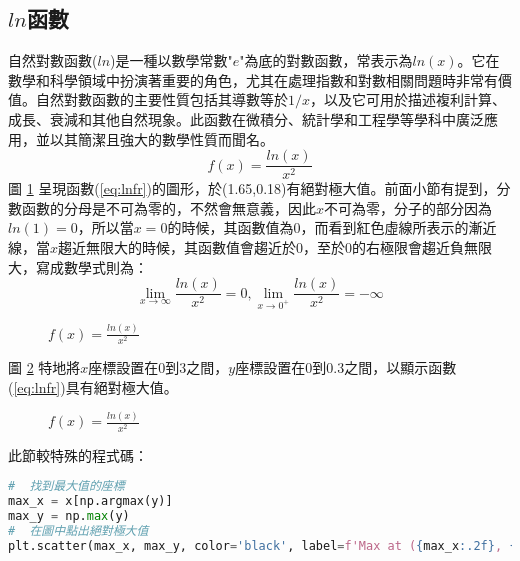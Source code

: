 \documentclass[12pt, a4paper]{article}
\begin{document}
\subsection{$ln$函數}
自然對數函數($ln$)是一種以數學常數"$e$"為底的對數函數，常表示為$ln(x)$。它在數學和科學領域中扮演著重要的角色，尤其在處理指數和對數相關問題時非常有價值。自然對數函數的主要性質包括其導數等於$1/x$，以及它可用於描述複利計算、成長、衰減和其他自然現象。此函數在微積分、統計學和工程學等學科中廣泛應用，並以其簡潔且強大的數學性質而聞名。
\begin{equation}\label{eq:lnfr}
f(x)= \frac{ln (x)}{x^2}
\end{equation}
圖 \ref{fig:lnfr_1} 呈現函數(\ref{eq:lnfr})的圖形，於(1.65,0.18)有絕對極大值。前面小節有提到，分數函數的分母是不可為零的，不然會無意義，因此$x$不可為零，分子的部分因為$ln(1)=0$，所以當$x=0$的時候，其函數值為0，而看到紅色虛線所表示的漸近線，當$x$趨近無限大的時候，其函數值會趨近於0，至於0的右極限會趨近負無限大，寫成數學式則為：
$$\lim_{x \rightarrow \infty}\frac{ln(x)}{x^2}=0,\lim_{x \rightarrow 0^+}\frac{ln(x)}{x^2}=-\infty$$
\begin{figure}[H]
    \caption{$f(x) = \frac{ln(x)}{x^2}$}
    \label{fig:lnfr_1}
\end{figure}
圖 \ref{fig:lnfr_2} 特地將$x$座標設置在0到3之間，$y$座標設置在0到0.3之間，以顯示函數(\ref{eq:lnfr})具有絕對極大值。
\begin{figure}[H]
    \caption{$f(x) = \frac{ln(x)}{x^2}$}
    \label{fig:lnfr_2}
\end{figure}
此節較特殊的程式碼：
\begin{lstlisting}[language=Python]
#  找到最大值的座標
max_x = x[np.argmax(y)]
max_y = np.max(y)
#  在圖中點出絕對極大值
plt.scatter(max_x, max_y, color='black', label=f'Max at ({max_x:.2f}, {max_y:.2f})', zorder=5)
\end{lstlisting}
\end{document}
